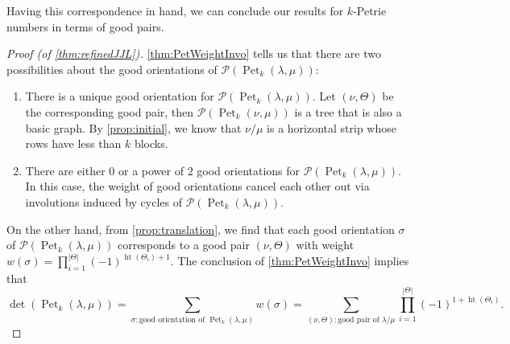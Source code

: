 \documentclass[pdflatex,sn-mathphys-num]{sn-jnl}%
\theoremstyle{thmstyleone}%
\theoremstyle{thmstyletwo}%
\newtheorem{remark}[theorem]{Remark}
\theoremstyle{thmstylethree}%
\numberwithin{equation}{section}
\DeclareMathOperator{\Pet}{Pet}
\DeclareMathOperator{\htt}{ht}
\begin{document}
	

    Having this correspondence in hand, we can conclude our results for $k$-Petrie numbers in terms of good pairs.
    

    \begin{proof}[Proof (of \cref{thm:refinedJJL})]
        \cref{thm:PetWeightInvo} tells us that there are two possibilities about the good orientations of $\mathcal{P}(\Pet_k(\lambda,\mu))$:
        \begin{enumerate}
            \item There is a unique good orientation for $\mathcal{P}(\Pet_k(\lambda,\mu))$. Let $(\nu,\Theta)$ be the corresponding good pair, then $\mathcal{P}(\Pet_k(\nu,\mu))$ is a tree that is also a basic graph. By \cref{prop:initial}, we know that $\nu/\mu$ is a horizontal strip whose rows have less than $k$ blocks.

            \item There are either $0$ or a power of $2$ good orientations for $\mathcal{P}(\Pet_k(\lambda,\mu))$. In this case, the weight of good orientations cancel each other out via involutions induced by cycles of $\mathcal{P}(\Pet_k(\lambda,\mu))$.
        \end{enumerate}
        
        On the other hand, from \cref{prop:translation}, we find that each good orientation $\sigma$ of $\mathcal{P}(\Pet_k(\lambda,\mu))$ corresponds to a good pair $(\nu,\Theta)$ with weight $w(\sigma)=\prod_{i=1}^{|\Theta|}(-1)^{\htt(\Theta_i)+1}$. The conclusion of \cref{thm:PetWeightInvo} implies that
        \[\det(\Pet_k(\lambda,\mu)) = \sum_{\sigma:\text{good orientation of }\Pet_k(\lambda,\mu)}w(\sigma) = \sum_{(\nu,\Theta):\text{good pair of }\lambda/\mu}\prod_{i=1}^{|\Theta|}(-1)^{1+\htt(\Theta_i)}.\]
    \end{proof}

			
\end{document}

